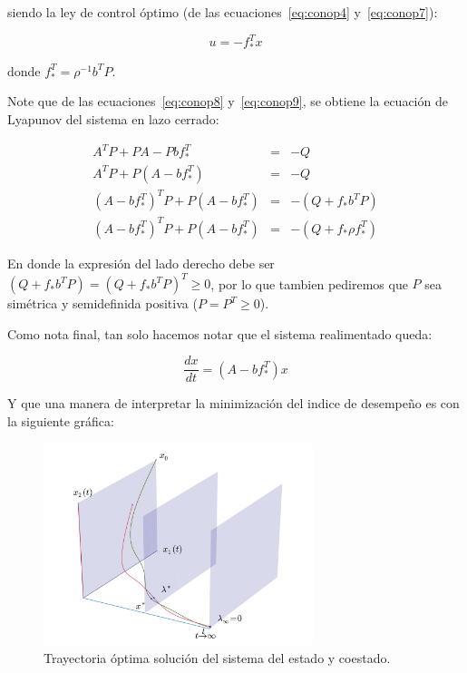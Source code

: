     siendo la ley de control óptimo (de las ecuaciones~\ref{eq:conop4} y~\ref{eq:conop7}):

    \begin{equation} \label{eq:conop9}
        u = -f_*^T x
    \end{equation}

    donde $f_*^T = \rho^{-1} b^T P$.

    Note que de las ecuaciones~\ref{eq:conop8} y~\ref{eq:conop9}, se obtiene la ecuación de Lyapunov del sistema en lazo cerrado:

    \begin{eqnarray}
        A^T P + P A - P b f_*^T & = & -Q \nonumber \\
        A^T P + P \left( A - b f_*^T \right) & = & - Q \nonumber \\
        \left( A - b f_*^T \right)^T P + P \left( A - b f_*^T \right) & = & - \left( Q + f_* b^T P \right) \nonumber \\
        \left( A - b f_*^T \right)^T P + P \left( A - b f_*^T \right) & = & - \left( Q + f_* \rho f_*^T \right)
    \end{eqnarray}

    En donde la expresión del lado derecho debe ser $\left( Q + f_* b^T P \right) = \left( Q + f_* b^T P \right)^T \ge 0$, por lo que tambien pediremos que $P$ sea simétrica y semidefinida positiva ($P = P^T \ge 0$).

    Como nota final, tan solo hacemos notar que el sistema realimentado queda:

    \begin{equation} \label{eq:conop12}
        \frac{dx}{dt} = (A - b f_*^T) x
    \end{equation}

    Y que una manera de interpretar la minimización del indice de desempeño es con la siguiente gráfica:

    \begin{figure}
        \centering
        \includegraphics[width=0.7\textwidth]{./imagenes/trayectorias3d.pdf}
        \caption{\label{fig:trayectoriaoptima}Trayectoria óptima solución del sistema del estado y coestado.}
    \end{figure}


